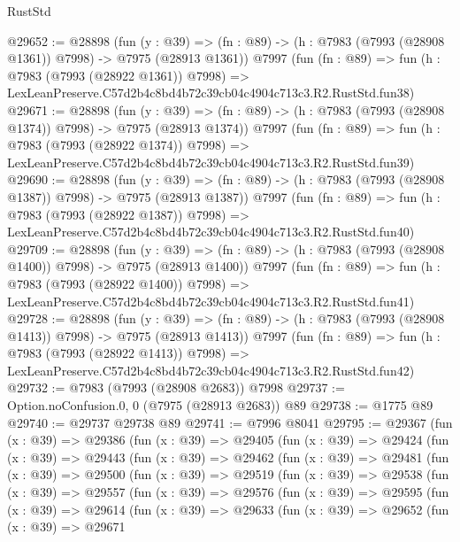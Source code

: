 \begin{lexlean}{RustStd}
\begin{coremodule}
@29652 := @28898
    (fun (y : @39) =>
    (fn : @89) -> (h : @7983 (@7993 (@28908 @1361)) @7998) -> @7975 (@28913 @1361))
    @7997
    (fun (fn : @89) =>
    fun (h : @7983 (@7993 (@28922 @1361)) @7998) =>
    LexLeanPreserve.C57d2b4c8bd4b72c39cb04c4904c713c3.R2.RustStd.fun38)
@29671 := @28898
    (fun (y : @39) =>
    (fn : @89) -> (h : @7983 (@7993 (@28908 @1374)) @7998) -> @7975 (@28913 @1374))
    @7997
    (fun (fn : @89) =>
    fun (h : @7983 (@7993 (@28922 @1374)) @7998) =>
    LexLeanPreserve.C57d2b4c8bd4b72c39cb04c4904c713c3.R2.RustStd.fun39)
@29690 := @28898
    (fun (y : @39) =>
    (fn : @89) -> (h : @7983 (@7993 (@28908 @1387)) @7998) -> @7975 (@28913 @1387))
    @7997
    (fun (fn : @89) =>
    fun (h : @7983 (@7993 (@28922 @1387)) @7998) =>
    LexLeanPreserve.C57d2b4c8bd4b72c39cb04c4904c713c3.R2.RustStd.fun40)
@29709 := @28898
    (fun (y : @39) =>
    (fn : @89) -> (h : @7983 (@7993 (@28908 @1400)) @7998) -> @7975 (@28913 @1400))
    @7997
    (fun (fn : @89) =>
    fun (h : @7983 (@7993 (@28922 @1400)) @7998) =>
    LexLeanPreserve.C57d2b4c8bd4b72c39cb04c4904c713c3.R2.RustStd.fun41)
@29728 := @28898
    (fun (y : @39) =>
    (fn : @89) -> (h : @7983 (@7993 (@28908 @1413)) @7998) -> @7975 (@28913 @1413))
    @7997
    (fun (fn : @89) =>
    fun (h : @7983 (@7993 (@28922 @1413)) @7998) =>
    LexLeanPreserve.C57d2b4c8bd4b72c39cb04c4904c713c3.R2.RustStd.fun42)
@29732 := @7983 (@7993 (@28908 @2683)) @7998
@29737 := Option.noConfusion.{0, 0} (@7975 (@28913 @2683)) @89
@29738 := @1775 @89
@29740 := @29737 @29738 @89
@29741 := @7996 @8041
@29795 := @29367
    (fun (x : @39) =>
    @29386
      (fun (x : @39) =>
      @29405
        (fun (x : @39) =>
        @29424
          (fun (x : @39) =>
          @29443
            (fun (x : @39) =>
            @29462
              (fun (x : @39) =>
              @29481
                (fun (x : @39) =>
                @29500
                  (fun (x : @39) =>
                  @29519
                    (fun (x : @39) =>
                    @29538
                      (fun (x : @39) =>
                      @29557
                        (fun (x : @39) =>
                        @29576
                          (fun (x : @39) =>
                          @29595
                            (fun (x : @39) =>
                            @29614
                              (fun (x : @39) =>
                              @29633
                                (fun (x : @39) =>
                                @29652
                                  (fun (x : @39) =>
                                  @29671

\end{coremodule}
\end{lexlean}
